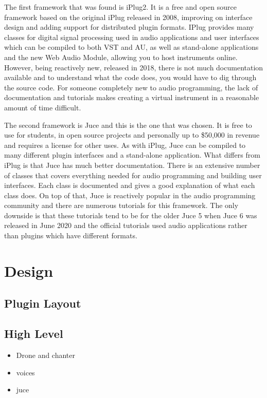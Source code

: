\documentclass[12pt]{article}
\begin{document}
	The first framework that was found is iPlug2. It is a free and open source framework based on the original iPlug released in 2008, improving on interface design 
	and adding support for distributed plugin formats. IPlug provides many classes for digital signal processing used in audio applications and user interfaces which can be
	compiled to both VST and AU, as well as stand-alone applications and the new Web Audio Module, allowing you to host instruments online.
	However, being reactively new, released in 2018, there is not much documentation available and to understand what the code does, you would have to dig through the source code.
	For someone completely new to audio programming, the lack of documentation and tutorials makes creating a virtual instrument in a reasonable amount of time difficult.
	
	The second framework is Juce and this is the one that was chosen. It is free to use for students, in open source projects and personally up to \$50,000 in revenue and 
	requires a license for other uses.
	As with iPlug, Juce can be compiled to many different plugin interfaces and a stand-alone application. What differs from iPlug is that Juce has much better documentation.
	There is an extensive number of classes that covers everything needed for audio programming and building user interfaces. 
	Each class is documented and gives a good explanation of what each class does. On top of that, Juce is reactively popular in the audio programming community and there
	are numerous tutorials for this framework. The only downside is that these tutorials tend to be for the older Juce 5 when Juce 6 was released in June 2020 and the official
	tutorials used audio applications rather than plugins which have different formats.
	

	
\section{Design}
	
	
	\subsection{Plugin Layout}
	
	
	
	
	
	
	
	
	
	
	\subsection{High Level}
	\begin{itemize}
		\item Drone and chanter
		\item voices
		\item juce
	\end{itemize}
\end{document}

